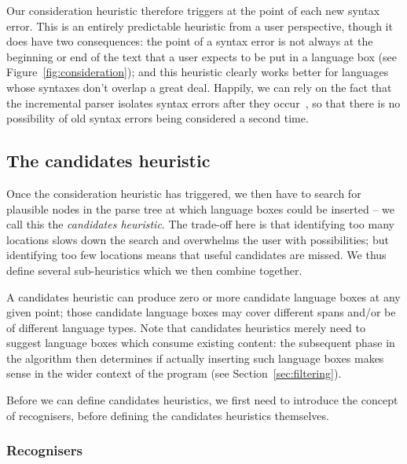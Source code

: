 \documentclass[sigplan,screen]{acmart}\settopmatter{printfolios=true,printccs=false,printacmref=false}
\begin{document}
Our consideration heuristic therefore triggers at the point of each new syntax error.
This is an entirely predictable heuristic from a user perspective, though it
does have two consequences: the point of a syntax error is not always at the
beginning or end of the text that a user expects to be put in a language box
(see Figure~\ref{fig:consideration}); and this heuristic clearly works better
for languages whose syntaxes don't overlap a great deal. Happily, we can rely
on the fact that the incremental parser isolates syntax errors after they
occur~\cite[p.~93]{wagner98practicalalgorithms}, so that there is no
possibility of old syntax errors being considered a second time.


\subsection{The candidates heuristic}

Once the consideration heuristic has triggered, we then have to search for
plausible nodes in the parse tree at which language boxes could be inserted -- we call this the
\emph{candidates heuristic}. The trade-off here is that identifying too many
locations slows down the search and overwhelms the user with possibilities; but
identifying too few locations means that useful candidates are missed. We thus
define several sub-heuristics which we then combine together.

A candidates heuristic
can produce zero or more candidate language boxes at any given point; those
candidate language boxes may cover different spans and/or be of different
language types. Note that candidates heuristics merely need to suggest language
boxes which consume existing content: the subsequent phase in the algorithm
then determines if actually inserting such language boxes makes sense in the
wider context of the program (see Section~\ref{sec:filtering}).

Before we can define candidates heuristics, we first need to introduce the
concept of recognisers, before defining the candidates heuristics themselves.


\subsubsection{Recognisers}
\label{sec:recognisers}
\end{document}
